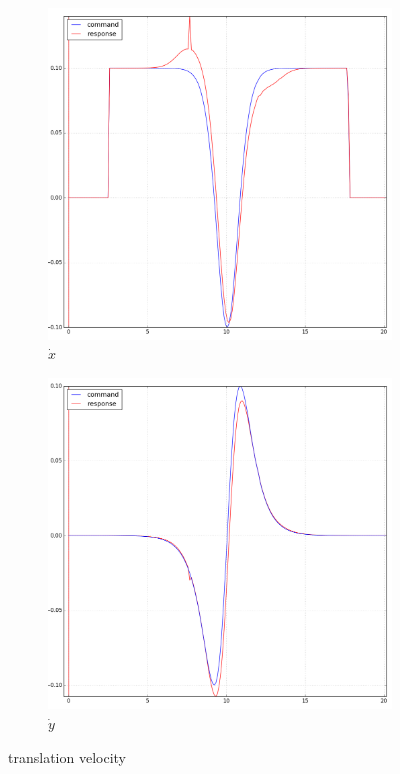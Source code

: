 \begin{figure}[H]
     \centering
     \begin{subfigure}[b]{0.49\textwidth}
         \centering
          \includegraphics[width=1.05\textwidth]{Figures/360_x.png}
         \caption{$\dot{x}$}
         \label{fig:360X}
     \end{subfigure}
     \hfill
     \begin{subfigure}[b]{0.49\textwidth}
         \centering
         \includegraphics[width=1.05\textwidth]{Figures/360_y.png}
         \caption{$\dot{y}$}
         \label{fig:90Y}
     \end{subfigure}
     
        \caption{translation velocity}
        \label{fig:360}
\end{figure}
